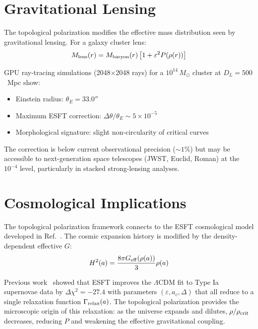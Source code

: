 ﻿\documentclass[twocolumn,preprintnumbers,amsmath,amssymb,prd]{revtex4-2}
\begin{document}
\section{Gravitational Lensing}
\label{sec:lensing}

The topological polarization modifies the effective mass distribution seen by gravitational lensing. For a galaxy cluster lens:
\begin{equation}
M_{\rm lens}(r) = M_{\rm baryon}(r)\left[1 + \varepsilon^2 P(\rho(r))\right]
\end{equation}

GPU ray-tracing simulations (2048$\times$2048 rays) for a $10^{14}\,M_\odot$ cluster at $D_L = 500$~Mpc show:
\begin{itemize}
\item Einstein radius: $\theta_E = 33.0''$
\item Maximum ESFT correction: $\Delta\theta/\theta_E \sim 5 \times 10^{-5}$
\item Morphological signature: slight non-circularity of critical curves
\end{itemize}

The correction is below current observational precision ($\sim 1\%$) but may be accessible to next-generation space telescopes (JWST, Euclid, Roman) at the $10^{-4}$ level, particularly in stacked strong-lensing analyses.

\section{Cosmological Implications}
\label{sec:cosmo}

The topological polarization framework connects to the ESFT cosmological model developed in Ref.~\cite{Paper1}. The cosmic expansion history is modified by the density-dependent effective $G$:
\begin{equation}
H^2(a) = \frac{8\pi G_{\rm eff}(\rho(a))}{3}\rho(a)
\end{equation}

Previous work~\cite{Paper1} showed that ESFT improves the $\Lambda$CDM fit to Type Ia supernovae data by $\Delta\chi^2 = -27.4$ with parameters $(\varepsilon, a_c, \Delta)$ that all reduce to a single relaxation function $\Gamma_{\rm relax}(a)$. The topological polarization provides the microscopic origin of this relaxation: as the universe expands and dilutes, $\rho/\rho_{\rm crit}$ decreases, reducing $P$ and weakening the effective gravitational coupling.
\end{document}
